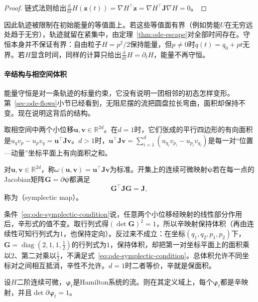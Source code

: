 \begin{proof}
  链式法则给出$\frac{\mathrm d}{\mathrm dt}H(\bm z(t))=\nabla H^\top\dot{\bm z}=\nabla H^\top\bm J\nabla H=0$。
\end{proof}

因此轨迹被限制在初始能量的等值面上。若这些等值面有界（例如势能$U$在无穷远处趋于无穷），轨迹就留在紧集中，由定理~\ref{thm:ode-escape}对全部时间存在。守恒本身并不保证有界：自由粒子$H=p^2/2$保持能量，但$p\neq0$时$q(t)=q_0+pt$无界。若$H$显含时间，同样的计算只给出$\frac{\mathrm d}{\mathrm dt}H=\partial_tH$，能量不再守恒。

\paragraph{辛结构与相空间体积}
能量守恒是对一条轨迹的标量约束，它没有说明一团相邻的初态怎样变形。第~\ref{sec:ode-flows}小节已经看到，无阻尼摆的流把圆盘拉长弯曲，面积却保持不变。现在说明这背后的结构。

取相空间中两个小位移$\bm u,\bm v\in\mathbb R^{2d}$。在$d=1$时，它们张成的平行四边形的有向面积是$u_qv_p-u_pv_q=\bm u^\top\bm J\bm v$。$d>1$时，$\bm u^\top\bm J\bm v=\sum_{i=1}^d(u_{q_i}v_{p_i}-u_{p_i}v_{q_i})$是每一对“位置—动量”坐标平面上有向面积之和。

\begin{definition}[辛形式与辛映射]
  \label{def:ode-symplectic-map}
  对$\bm u,\bm v\in\mathbb R^{2d}$，称$\omega(\bm u,\bm v)=\bm u^\top\bm J\bm v$为标准。开集上的连续可微映射$\bm\psi$若在每一点的Jacobian矩阵$\bm G=\partial\bm\psi$都满足
  \begin{equation}
    \bm G^\top\bm J\bm G=\bm J,
    \label{eq:ode-symplectic-condition}
  \end{equation}
  称为（symplectic map）。
\end{definition}

条件~\eqref{eq:ode-symplectic-condition}说，任意两个小位移经映射的线性部分作用后，辛形式的值不变。取行列式得$(\det\bm G)^2=1$，所以辛映射保持体积（再由连续性可知行列式为$1$，也保持定向）。反过来不成立：在坐标$(q_1,q_2,p_1,p_2)$下，$\bm G=\operatorname{diag}(2,1,1,\tfrac12)$的行列式为$1$，保持体积，却把第一对坐标平面上的面积乘以$2$、第二对乘以$\tfrac12$，不满足式~\eqref{eq:ode-symplectic-condition}。总体积允许不同坐标对之间相互抵消，辛性不允许。$d=1$时二者等价，辛就是保面积。

\begin{theorem}[Hamilton流是辛映射]
  \label{thm:ode-hamiltonian-flow-symplectic}
  设$H$二阶连续可微，$\bm\varphi_t$是Hamilton系统的流。则在其定义域上，每个$\bm\varphi_t$都是辛映射，并且$\det\partial\bm\varphi_t=1$。
\end{theorem}

